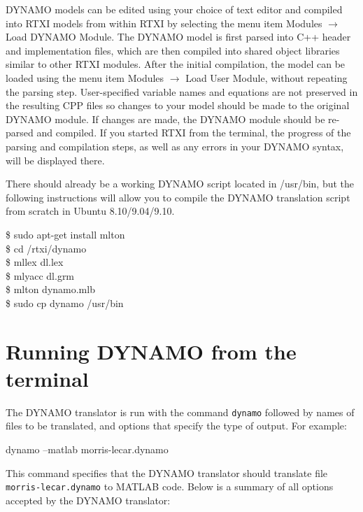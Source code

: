 DYNAMO models can be edited using your choice of text editor and compiled into RTXI models from within RTXI by selecting the menu item Modules $\rightarrow$ Load DYNAMO Module. The DYNAMO model is first parsed into C++ header and implementation files, which are then compiled into shared object libraries similar to other RTXI modules. After the initial compilation, the model can be loaded using the menu item Modules $\rightarrow$ Load User Module, without repeating the parsing step. User-specified variable names and equations are not preserved in the resulting CPP files so changes to your model should be made to the original DYNAMO module. If changes are made, the DYNAMO module should be re-parsed and compiled. If you started RTXI from the terminal, the progress of the parsing and compilation steps, as well as any errors in your DYNAMO  syntax, will be displayed there.

There should already be a working DYNAMO script located in /usr/bin, but the following instructions will allow you to compile the DYNAMO translation script from scratch in Ubuntu 8.10/9.04/9.10. 
\begin{example}
\$ sudo apt-get install mlton\\
\$ cd /rtxi/dynamo\\
\$ mllex dl.lex\\
\$ mlyacc dl.grm\\
\$ mlton dynamo.mlb\\
\$ sudo cp dynamo /usr/bin
\end{example}

\section{Running DYNAMO from the terminal}

The DYNAMO translator is run with the command \texttt{dynamo} followed by names of files to be translated, and options that specify the type of output. For example:

\begin{example}
  dynamo --matlab  morris-lecar.dynamo
\end{example}

This command specifies that the DYNAMO translator should translate file \texttt{morris-lecar.dynamo} to MATLAB code. Below is a summary of all options accepted by the DYNAMO translator:

